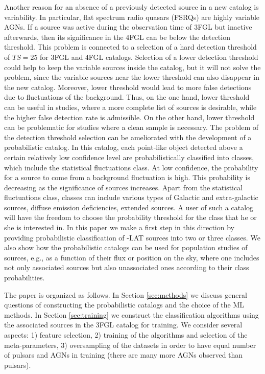 Another reason for an absence of a previously detected source in a new catalog is variability.
In particular, flat spectrum radio quasars (FSRQs) are highly variable AGNs.
If a source was active during the observation time of 3FGL but inactive afterwards, 
then its significance in the 4FGL can be below the detection threshold.
This problem is connected to a selection of a hard detection threshold of $TS = 25$ for 3FGL and 4FGL catalogs.
Selection of a lower detection threshold could help to keep the variable sources inside the catalog, 
but it will not solve the problem, since the variable sources near the lower threshold can also disappear in the new catalog.
Moreover, lower threshold would lead to more false detections due to fluctuations of the background.
Thus, on the one hand, lower threshold can be useful in studies, where a more complete list of sources is desirable,
while the higher false detection rate is admissible. On the other hand, lower threshold can be problematic for studies where 
a clean sample is necessary. 
The problem of the detection threshold selection can be ameliorated with the development of a probabilistic catalog.
In this catalog, each point-like object detected above a certain relatively low confidence level
are probabilistically classified into classes, which include the statistical fluctuations class.
At low confidence, the probability for a source to come from a background fluctuation is high.
This probability is decreasing as the significance of sources increases.
Apart from the statistical fluctuations class, classes can include various types of Galactic and extra-galactic sources, diffuse emission deficiencies, extended sources.
A user of such a catalog will have the freedom to choose the probability threshold for the class that he or she is interested in.
In this paper we make a first step in this direction by providing probabilistic classification of \Fermi-LAT sources into two or three classes.
We also show how the probabilistic catalogs can be used for population studies of sources, e.g., as a function of their flux or position on the sky, where one includes not only associated sources but also unassociated ones according to their class probabilities.

The paper is organized as follows.
In Section \ref{sec:methods} we discuss general questions of constructing the probabilistic catalogs and the choice of the ML methods.
In Section \ref{sec:training} we construct the classification algorithms using the associated sources in the 3FGL catalog for training. We consider several aspects: 1) feature selection, 2) training of the algorithms and selection of the meta-parameters,
3) oversampling of the datasets in order to have equal number of pulsars and AGNs in training (there are many more AGNs observed than pulsars).

